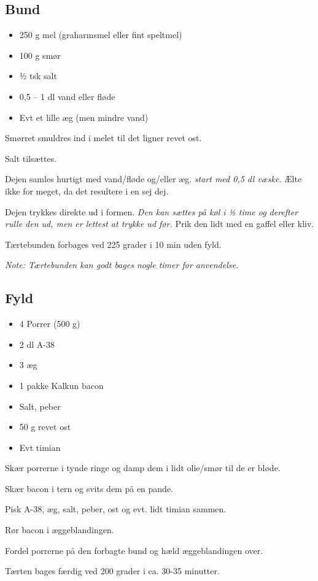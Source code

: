 \documentclass[a4paper]{article}
\begin{document}
\subsection*{Bund}

\begin{itemize}
\item 250 g mel (graharmsmel eller fint speltmel)
\item 100 g smør
\item ½ tsk salt
\item 0,5 – 1 dl vand eller fløde
\item Evt et lille æg (men mindre vand)
\end{itemize}

Smørret smuldres ind i melet til det ligner revet ost.

Salt tilsættes.

Dejen samles hurtigt med vand/fløde og/eller æg. \textit{start med 0,5 dl væske}. Ælte ikke for meget, da det resultere i en sej dej.

Dejen trykkes direkte ud i formen. \textit{Den kan sættes på køl i ½ time og derefter rulle den ud, men er lettest at trykke ud før.} Prik den lidt med en gaffel eller kliv.

Tærtebunden forbages ved 225 grader i 10 min uden fyld.

\textit{Note: Tærtebunden kan godt bages nogle timer før anvendelse.}

\subsection*{Fyld}

\begin{itemize}
\item 4 Porrer (500 g)
\item 2 dl A-38
\item 3 æg
\item 1 pakke Kalkun bacon
\item Salt, peber
\item 50 g revet ost
\item Evt timian
\end{itemize}

Skær porrerne i tynde ringe og damp dem i lidt olie/smør til de er bløde.

Skær bacon i tern og svits dem på en pande.

Pisk A-38, æg, salt, peber, ost og evt. lidt timian sammen.

Rør bacon i æggeblandingen.

Fordel porrerne på den forbagte bund og hæld æggeblandingen over.

Tærten bages færdig ved 200 grader i ca. 30-35 minutter.
\end{document}
